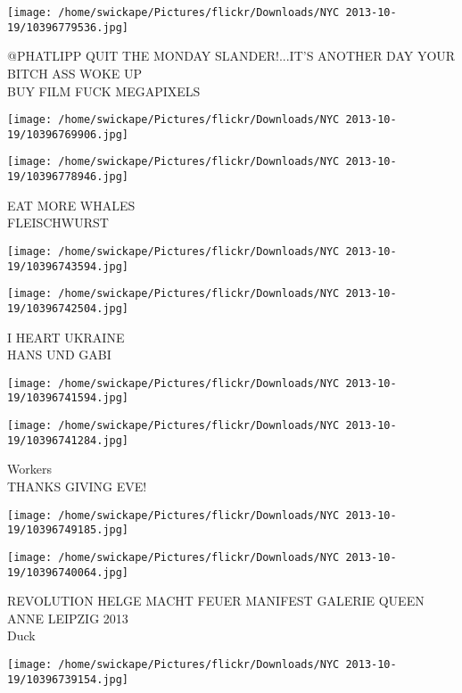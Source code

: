 \documentclass[10pt,letterpaper]{article}
\begin{document}
\vspace{0.25in}
\texttt{[image: /home/swickape/Pictures/flickr/Downloads/NYC 2013-10-19/10396779536.jpg]}

@PHATLIPP QUIT THE MONDAY SLANDER!...IT'S ANOTHER DAY YOUR BITCH ASS WOKE UP\\
BUY FILM FUCK MEGAPIXELS\\
\pagebreak

\texttt{[image: /home/swickape/Pictures/flickr/Downloads/NYC 2013-10-19/10396769906.jpg]}

\vspace{0.25in}
\texttt{[image: /home/swickape/Pictures/flickr/Downloads/NYC 2013-10-19/10396778946.jpg]}

EAT MORE WHALES\\
FLEISCHWURST\\
\pagebreak

\texttt{[image: /home/swickape/Pictures/flickr/Downloads/NYC 2013-10-19/10396743594.jpg]}

\vspace{0.25in}
\texttt{[image: /home/swickape/Pictures/flickr/Downloads/NYC 2013-10-19/10396742504.jpg]}

I HEART UKRAINE\\
HANS UND GABI\\
\pagebreak

\texttt{[image: /home/swickape/Pictures/flickr/Downloads/NYC 2013-10-19/10396741594.jpg]}

\vspace{0.25in}
\texttt{[image: /home/swickape/Pictures/flickr/Downloads/NYC 2013-10-19/10396741284.jpg]}

Workers\\
THANKS GIVING EVE!\\
\pagebreak

\texttt{[image: /home/swickape/Pictures/flickr/Downloads/NYC 2013-10-19/10396749185.jpg]}

\vspace{0.25in}
\texttt{[image: /home/swickape/Pictures/flickr/Downloads/NYC 2013-10-19/10396740064.jpg]}

REVOLUTION HELGE MACHT FEUER MANIFEST GALERIE QUEEN ANNE LEIPZIG 2013\\
Duck\\
\pagebreak

\texttt{[image: /home/swickape/Pictures/flickr/Downloads/NYC 2013-10-19/10396739154.jpg]}
\end{document}
